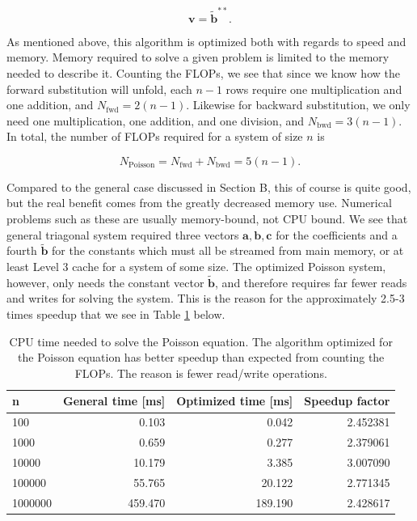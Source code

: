 \documentclass[]{article}
\begin{document}
\begin{equation*}
\mathbf{v} = \mathbf{\tilde{b}^{\ast\ast}}\text{.}
\end{equation*}

As mentioned above, this algorithm is optimized both with regards to speed and memory. Memory required to solve a given problem is limited to the memory needed to describe it. Counting the FLOPs, we see that since we know how the forward substitution will unfold, each $n-1$ rows require one multiplication and one addition, and $N_{\text{fwd}} = 2(n-1)$. Likewise for backward substitution, we only need one multiplication, one addition, and one division, and $N_{\text{bwd}} = 3(n-1)$. In total, the number of FLOPs required for a system of size $n$ is

\begin{equation*}
N_{\text{Poisson}} = N_{\text{fwd}} + N_{\text{bwd}} = 5(n-1).
\end{equation*}

Compared to the general case discussed in Section B, this of course is quite good, but the real benefit comes from the greatly decreased memory use. Numerical problems such as these are usually memory-bound, not CPU bound. We see that general triagonal system required three vectors $\mathbf{a},\mathbf{b},\mathbf{c}$ for the coefficients and a fourth $\mathbf{\tilde{b}}$ for the constants which must all be streamed from main memory, or at least Level 3 cache for a system of some size. The optimized Poisson system, however, only needs the constant vector $\mathbf{\tilde{b}}$, and therefore requires far fewer reads and writes for solving the system. This is the reason for the approximately 2.5-3 times speedup that we see in Table \ref{tab:CPU-times} below.


\begin{table}[ht]
\caption{CPU time needed to solve the Poisson equation. The algorithm optimized for the Poisson equation has better speedup than expected from counting the FLOPs. The reason is fewer read/write operations.}
\label{tab:CPU-times}
\begin{center}
\begin{tabular}{lrrr}
	\toprule
	n &  General time [ms] &  Optimized time [ms] & Speedup factor \\
	\midrule
	100     &    0.103 &    0.042 &  2.452381 \\
	1000    &    0.659 &    0.277 &  2.379061 \\
	10000   &   10.179 &    3.385 &  3.007090 \\
	100000  &   55.765 &   20.122 &  2.771345 \\
	1000000 &  459.470 &  189.190 &  2.428617 \\
	\bottomrule
\end{tabular}
\end{center}
\end{table}
\end{document}
